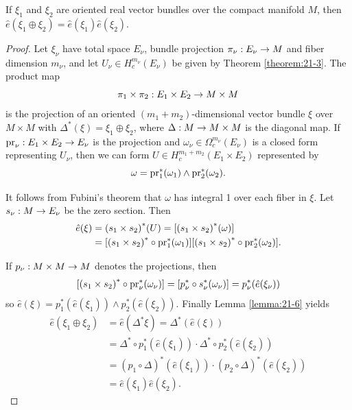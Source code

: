\begin{lemma}\label{lemma:21-7}
  If ${\xi }_{1}$ and ${\xi }_{2}$ are oriented real vector bundles over the compact manifold $M$, 
  then $\hat{e}( {{\xi }_{1} \oplus  {\xi }_{2}})  = \hat{e}( {\xi }_{1}) \hat{e}( {\xi }_{2})$.
\end{lemma}


\begin{proof}
  Let ${\xi }_{\nu }$ have total space ${E}_{\nu }$, bundle projection ${\pi }_{\nu } : {E}_{\nu } \rightarrow  M$ 
  and fiber dimension ${m}_{\nu }$, and let ${U}_{\nu } \in  H_c^{{m}_{\nu }}( {E}_{\nu })$ be given 
  by Theorem \ref{theorem:21-3}. The product map
  \[
    {\pi }_{1} \times  {\pi }_{2} : {E}_{1} \times  {E}_{2} \rightarrow  M \times  M
  \]
  is the projection of an oriented $( {{m}_{1} + {m}_{2}})$-dimensional vector bundle $\xi$ over $M \times  M$ 
  with ${\Delta }^*( \xi )  = {\xi }_{1} \oplus  {\xi }_{2}$, where $\Delta  : M \rightarrow  M \times  M$ is the 
  diagonal map. If ${\mathrm{pr}}_{\nu } : {E}_{1} \times  {E}_{2} \rightarrow  {E}_{\nu }$ is the projection 
  and ${\omega }_{\nu } \in  {\Omega }_{c}^{{m}_{\nu }}( {E}_{\nu })$ is a closed form representing ${U}_{\nu }$, 
  then we can form $U \in  H_c^{{m}_{1} + {m}_{2}}( {{E}_{1} \times  {E}_{2}})$ represented by
  \[
    \omega  = {\mathrm{pr}}_{1}^*( {\omega }_{1})  \land  {\ensuremath{\mathrm{pr}}}_{2}^*( {\omega }_{2}).
  \]
  
  It follows from Fubini’s theorem that $\omega$ has integral 1 over each fiber in $\xi$. Let $s_\nu:M\rightarrow E_\nu$ 
  be the zero section. Then
  \begin{align*}
      \hat{e}( \xi ) 
      & = { ({s}_{1} \times  {s}_{2}) }^*( U)  
        = [ {{( {s}_{1} \times  {s}_{2}) }^*( \omega ) }] \\
      & = [ {{( {s}_{1} \times  {s}_{2}) }^* \circ {\ensuremath{\mathrm{pr}}}_{1}^*( {\omega }_{1}) }]  
          [ {{( {s}_{1} \times  {s}_{2}) }^* \circ {\ensuremath{\mathrm{pr}}}_{2}^*( {\omega }_{2}) }].  
  \end{align*}
  
  If $p_\nu : M \times  M \rightarrow  M$ denotes the projections, then
  \[
    [{{( {s}_{1} \times  {s}_{2}) }^* \circ  {\ensuremath{\mathrm{pr}}}_{\nu }^*( {\omega }_{\nu }) }] 
    = [  {p_\nu^* \circ  {s}_{\nu }^*( {\omega }_{\nu }) }] 
    = p_\nu^*( {\hat{e}( {\xi }_{\nu }) })
  \]
  so $\hat{e}( \xi )  = {p}_{1}^*( {\hat{e}( {\xi }_{1}) })  \land  {p}_{2}^*( {\hat{e}( {\xi }_{2}) })$. 
  Finally Lemma \ref{lemma:21-6} yields
  \begin{align*}
    \hat{e}( {{\xi }_{1} \oplus  {\xi }_{2}}) 
    & = \hat{e}( {{\Delta }^*\xi }) = {\Delta }^*( {\hat{e}( \xi ) }) \\
    & = {\Delta }^* \circ  {p}_{1}^*( {\hat{e}( {\xi }_{1}) })\cdot{\Delta }^* \circ  {p}_{2}^*( {\hat{e}( {\xi }_{2}) }) \\
    & = {( {p}_{1} \circ  \Delta ) }^*( {\hat{e}( {\xi }_{1}) })\cdot{( {p}_{2} \circ  \Delta ) }^*( {\hat{e}( {\xi }_{2}) }) \\
    & = \hat{e}( {\xi }_{1}) \hat{e}( {\xi }_{2}).
  \end{align*}  
\end{proof}

